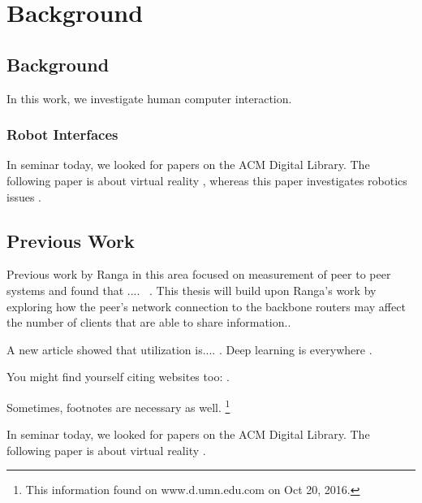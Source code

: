\chapter{Background}
\label{chap:background}

\section{Background}

In this work, we investigate human computer interaction. 

\subsection{Robot Interfaces}

In seminar today, we looked for papers on the ACM Digital Library. The
following paper is about virtual reality \parencite{Kreylos:2006:ESW:1128923.1128948}, whereas this paper investigates robotics issues \parencite{Drascic89}.

\section{Previous Work}

Previous work by Ranga in this area focused on measurement of peer to peer systems and found that .... ~\parencite{ranga15}. This thesis will build upon Ranga's work by exploring how the peer's network connection to the backbone routers may affect the number of clients that are able to share information..

A new article showed that utilization is.... \parencite{Abbasi:2013:DBS:2507924.2507961}. Deep learning is everywhere \parencite{Tang:2019:MTR:3365594.3358696}.

You might find yourself citing websites too: \cite{website1}.

Sometimes, footnotes are necessary as well. \footnote{This information found on www.d.umn.edu.com on Oct 20, 2016.}

In seminar today, we looked for papers on the ACM Digital Library. The
following paper is about virtual reality
\parencite{Kreylos:2006:ESW:1128923.1128948}.

